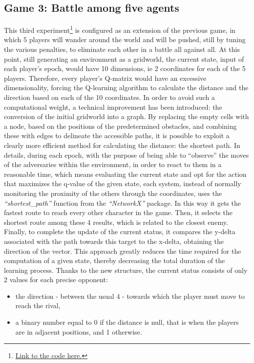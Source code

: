 \subsection{Game 3: Battle among five agents}
This third experiment\footnote{\href{https://github.com/moiraghif/DragonHunting/tree/master/Duel_2}{Link to the code here.}} is configured as an extension of the previous game, in which 5 players will wander around the world and will be pushed, still by tuning the various penalties, to eliminate each other in a battle all against all. At this point, still generating an environment as a gridworld, the current state, input of each player's epoch, would have 10 dimensions, ie 2 coordinates for each of the 5 players. Therefore, every player's Q-matrix would have an excessive dimensionality, forcing the Q-learning algorithm to calculate the distance and the direction based on each of the 10 coordinates. In order to avoid such a computational weight, a technical improvement has been introduced: the conversion of the initial gridworld into a graph. By replacing the empty cells with a node, based on the positions of the predetermined obstacles, and combining these with edges to delineate the accessible paths, it is possible to exploit a clearly more efficient method for calculating the distance: the shortest path. In details, during each epoch, with the purpose of being able to ``observe'' the moves of the adversaries within the environment, in order to react to them in a reasonable time, which means evaluating the current state and opt for the action that maximizes the q-value of the given state, each system, instead of normally monitoring the proximity of the others through the coordinates, uses the \textit{``shortest\_path''} function from the \textit{``NetworkX''} package. In this way it gets the fastest route to reach every other character in the game. Then, it selects the shortest route among these 4 results, which is related to the closest enemy. Finally, to complete the update of the current status, it compares the y-delta associated with the path towards this target to the x-delta, obtaining the direction of the vector. This approach greatly reduces the time required for the computation of a given state, thereby decreasing the total duration of the learning process. Thanks to the new structure, the current status consists of only 2 values for each precise opponent:
\begin{itemize}[noitemsep, topsep=0ex]
  \item the direction - between the usual 4 - towards which the player must move to reach the rival,
  \item a binary number equal to 0 if the distance is null, that is when the players are in adjacent positions, and 1 otherwise.
\end{itemize}
